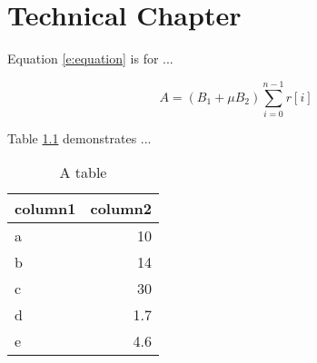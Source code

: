 \chapter[Tech chapter]{Technical Chapter} \label{c:tc2} 

Equation \ref{e:equation} is for ...


\begin{equation} 
\label{e:equation}
A = (B_1+ \mu B_2) \sum_{i=0}^{n-1}{r[i]}
\end{equation}


Table \ref{t:table} demonstrates ...

\begin{table}[!ht]
    \centering
    \caption{A table}\label{t:table}
    \begin{tabular}{|l|r|}
        \hline
        \textbf{column1} & \textbf{column2} \\  \hline
        a & 10 \\  \hline
        b & 14 \\  \hline 
        c & 30 \\  \hline
        d & 1.7\\ \hline 
        e & 4.6 \\ \hline 
    \end{tabular}
\end{table}


